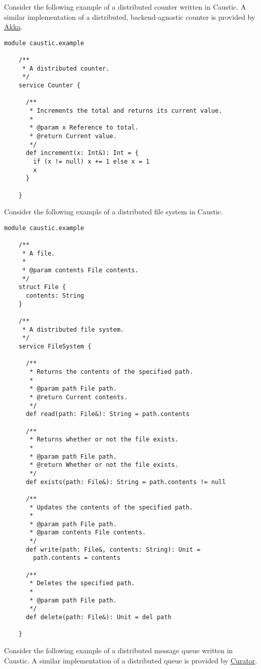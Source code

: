\documentclass[../main.tex]{subfiles}
\begin{document}
  Consider the following example of a distributed counter written in Caustic. A similar
  implementation of a distributed, backend-agnostic counter is provided by
  \href{https://git.io/vxS6u}{Akka}.

  \begin{lstlisting}[style=Caustic]
    module caustic.example

    /**
     * A distributed counter.
     */
    service Counter {

      /**
       * Increments the total and returns its current value.
       *
       * @param x Reference to total.
       * @return Current value.
       */
      def increment(x: Int&): Int = {
        if (x != null) x += 1 else x = 1
        x
      }

    }
  \end{lstlisting}

  Consider the following example of a distributed file system in Caustic.

  \begin{lstlisting}[style=Caustic]
    module caustic.example

    /**
     * A file.
     *
     * @param contents File contents.
     */
    struct File {
      contents: String
    }

    /**
     * A distributed file system.
     */
    service FileSystem {

      /**
       * Returns the contents of the specified path.
       *
       * @param path File path.
       * @return Current contents.
       */
      def read(path: File&): String = path.contents

      /**
       * Returns whether or not the file exists.
       *
       * @param path File path.
       * @return Whether or not the file exists.
       */
      def exists(path: File&): String = path.contents != null

      /**
       * Updates the contents of the specified path.
       *
       * @param path File path.
       * @param contents File contents.
       */
      def write(path: File&, contents: String): Unit =
        path.contents = contents

      /**
       * Deletes the specified path.
       *
       * @param path File path.
       */
      def delete(path: File&): Unit = del path

    }
  \end{lstlisting}

  Consider the following example of a distributed message queue written in Caustic. A similar
  implementation of a distributed queue is provided by \href{https://git.io/vpOT}{Curator}.
\end{document}
